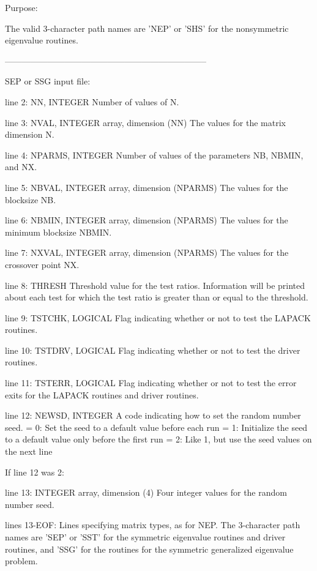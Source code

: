 \begin{DoxyParagraph}{Purpose\+: }
\begin{DoxyVerb}
          The valid 3-character path names are 'NEP' or 'SHS' for the
          nonsymmetric eigenvalue routines.

-----------------------------------------------------------------------

 SEP or SSG input file:

 line 2:  NN, INTEGER
          Number of values of N.

 line 3:  NVAL, INTEGER array, dimension (NN)
          The values for the matrix dimension N.

 line 4:  NPARMS, INTEGER
          Number of values of the parameters NB, NBMIN, and NX.

 line 5:  NBVAL, INTEGER array, dimension (NPARMS)
          The values for the blocksize NB.

 line 6:  NBMIN, INTEGER array, dimension (NPARMS)
          The values for the minimum blocksize NBMIN.

 line 7:  NXVAL, INTEGER array, dimension (NPARMS)
          The values for the crossover point NX.

 line 8:  THRESH
          Threshold value for the test ratios.  Information will be
          printed about each test for which the test ratio is greater
          than or equal to the threshold.

 line 9:  TSTCHK, LOGICAL
          Flag indicating whether or not to test the LAPACK routines.

 line 10: TSTDRV, LOGICAL
          Flag indicating whether or not to test the driver routines.

 line 11: TSTERR, LOGICAL
          Flag indicating whether or not to test the error exits for
          the LAPACK routines and driver routines.

 line 12: NEWSD, INTEGER
          A code indicating how to set the random number seed.
          = 0:  Set the seed to a default value before each run
          = 1:  Initialize the seed to a default value only before the
                first run
          = 2:  Like 1, but use the seed values on the next line

 If line 12 was 2:

 line 13: INTEGER array, dimension (4)
          Four integer values for the random number seed.

 lines 13-EOF:  Lines specifying matrix types, as for NEP.
          The 3-character path names are 'SEP' or 'SST' for the
          symmetric eigenvalue routines and driver routines, and
          'SSG' for the routines for the symmetric generalized
          eigenvalue problem.


\end{DoxyVerb}
\end{DoxyParagraph}
